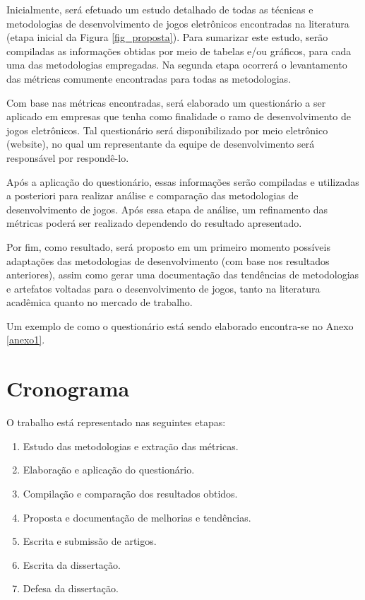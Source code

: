 \documentclass[quali]{ppgccufscar}
\begin{document}
Inicialmente, será efetuado um estudo detalhado de todas as técnicas e metodologias de desenvolvimento de jogos eletrônicos encontradas na literatura (etapa inicial da Figura \ref{fig_proposta}). Para sumarizar este estudo, serão compiladas as informações obtidas por meio de tabelas e/ou gráficos, para cada uma das metodologias empregadas. Na segunda etapa ocorrerá o levantamento das métricas comumente encontradas para todas as metodologias. 

Com base nas métricas encontradas, será elaborado um questionário a ser aplicado em empresas que tenha como finalidade o ramo de desenvolvimento de jogos eletrônicos. Tal questionário será disponibilizado por meio eletrônico (website), no qual um representante da equipe de desenvolvimento será responsável por respondê-lo. 

Após a aplicação do questionário, essas informações serão compiladas e utilizadas a posteriori para realizar análise e comparação das metodologias de desenvolvimento de jogos. Após essa etapa de análise, um refinamento das métricas poderá ser realizado dependendo do resultado apresentado.

Por fim, como resultado, será proposto em um primeiro momento possíveis adaptações das metodologias de desenvolvimento (com base nos resultados anteriores), assim como gerar uma documentação das tendências de metodologias e artefatos voltadas para o desenvolvimento de jogos, tanto na literatura acadêmica quanto no mercado de trabalho.

Um exemplo de como o questionário está sendo elaborado encontra-se no Anexo \ref{anexo1}.

%
%
%


\section{Cronograma}

O trabalho está representado nas seguintes etapas:

\begin{enumerate}
	\item Estudo das metodologias e extração das métricas.
	\item Elaboração e aplicação do questionário.
	\item Compilação e comparação dos resultados obtidos.
	\item Proposta e documentação de melhorias e tendências.
	\item Escrita e submissão de artigos.
	\item Escrita da dissertação.
	\item Defesa da dissertação.
\end{enumerate}
\end{document}
